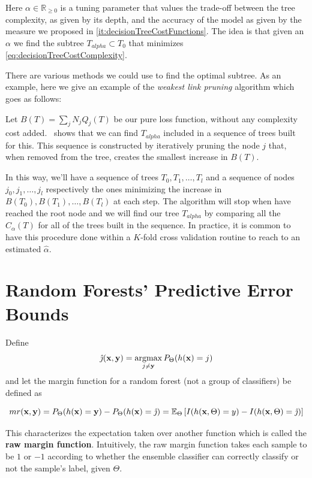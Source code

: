 \begin{appendices}
Here $\alpha \in \mathbb{R}_{\geq 0}$ is a tuning parameter that values the trade-off between the tree complexity, as given by its depth, and the accuracy of the model as given by the measure we proposed in \cref{it:decisionTreeCostFunctions}. The idea is that given an $\alpha$ we find the subtree $T_{alpha} \subset T_0$ that minimizes \cref{eq:decisionTreeCostComplexity}.

There are various methods we could use to find the optimal subtree. As an example, here we give an example of the \textit{weakest link pruning} algorithm which goes as follows:

Let $B(T) = \sum_{j} N_j Q_j(T) $ be our pure loss function, without any complexity cost added.~\cite{breiman-cart84} shows that we can find $T_{alpha}$ included in a sequence of trees built for this. This sequence is constructed by iteratively pruning the node $j$ that, when removed from the tree, creates the smallest increase in $B(T)$.


In this way, we'll have a sequence of trees $T_0,T_1,\ldots,T_l$ and a sequence of nodes $j_0, j_1,\ldots,j_l$ respectively the ones minimizing the increase in $B(T_0),B(T_1),\ldots,B(T_l)$ at each step. The algorithm will stop when have reached the root node and we will find our tree $T_{alpha}$ by comparing all the $C_\alpha(T)$ for all of the trees built in the sequence. In practice, it is common to have this procedure done within a $K$-fold cross validation routine to reach to an estimated $\hat{\alpha}$.


\section{Random Forests' Predictive Error Bounds}\label{appx:sec:rforest_predictive_error_bounds}


Define $$\hat{\jmath}( \textbf{x},\textbf{y}) = \operatorname*{argmax}_{j \neq \textbf{y}} P_{\Theta}(h(\textbf{x}) = j)$$ and let the margin function for a random forest (not a group of classifiers) be defined as

\[\label{eq:rf-marginFunRf}
mr(\textbf{x},\textbf{y}) = P_{\Theta}(h(\textbf{x}) = \textbf{y}) - P_{\Theta}(h(\textbf{x}) = \hat{\jmath})
\\
= \operatorname{\mathbb{E}}_{\Theta} \left[ I(h(\textbf{x},\Theta ) = y ) - I( h( \textbf{x},\Theta ) = \hat{\jmath} ) \right]
\]

This characterizes the expectation taken over another function which is called the \textbf{raw margin function}\label{eq:rf-rawMarginFun}.
Intuitively, the raw margin function takes each sample to be $1$ or $-1$ according to whether the ensemble classifier can correctly classify or not the sample's label, given $\Theta$.


\end{appendices}
